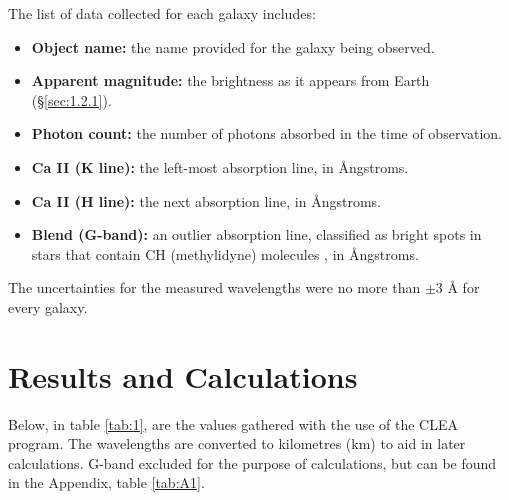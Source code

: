 \documentclass[12pt]{article}
\begin{document}
The list of data collected for each galaxy includes:

\begin{itemize}
    \item \textbf{Object name:} the name provided for the galaxy being observed.
    \item \textbf{Apparent magnitude:} the brightness as it appears from Earth (§\ref{sec:1.2.1}).
    \item \textbf{Photon count:} the number of photons absorbed in the time of observation.
    \item \textbf{Ca II (K line):} the left-most absorption line, in Ångstroms.
    \item \textbf{Ca II (H line):} the next absorption line, in Ångstroms.
    \item \textbf{Blend (G-band):} an outlier absorption line, classified as bright spots in stars that contain CH (methylidyne) molecules \cite{gband}, in Ångstroms.
\end{itemize}

The uncertainties for the measured wavelengths were no more than $\pm 3$ Å for every galaxy.

\newpage

\section{Results and Calculations} \label{sec:3}

Below, in table \ref{tab:1}, are the values gathered with the use of the CLEA program. The wavelengths are converted to kilometres (km) to aid 
in later calculations. G-band excluded for the purpose of calculations, but can be found in the Appendix, table \ref{tab:A1}.

\vspace{0.5cm}

\renewcommand{\arraystretch}{1.3}
\end{document}
